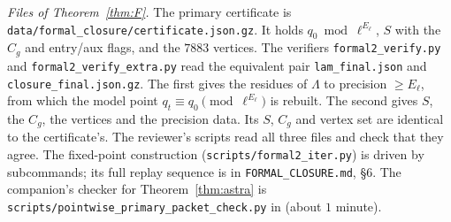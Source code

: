 \documentclass[11pt,reqno]{amsart}
\theoremstyle{definition}
\begin{document}
{\raggedright\noindent\emph{Files of Theorem~\ref{thm:F}.}  The primary certificate is
\verb|data/formal_closure/certificate.json.gz|.  It holds
$q_0\bmod\ell^{E_\ell}$, $S$ with the $C_g$ and entry/aux flags, and the
$7883$ vertices.  The verifiers \verb|formal2_verify.py| and
\verb|formal2_verify_extra.py| read the equivalent pair
\verb|lam_final.json| and \verb|closure_final.json.gz|.  The first gives the
residues of $\Lambda$ to precision $\ge E_\ell$, from which the model point
$q_t\equiv q_0\pmod{\ell^{E_\ell}}$ is rebuilt.  The second gives $S$, the
$C_g$, the vertices and the precision data.  Its $S$, $C_g$ and vertex set
are identical to the certificate's.  The reviewer's scripts read all three
files and check that they agree.  The fixed-point construction
(\verb|scripts/formal2_iter.py|) is driven by subcommands; its full replay
sequence is in \verb|FORMAL_CLOSURE.md|, \S6.  The companion's checker for
Theorem~\ref{thm:astra} is \verb|scripts/pointwise_primary_packet_check.py|
in \cite{AS} (about $1$ minute).
\par}
\end{document}
